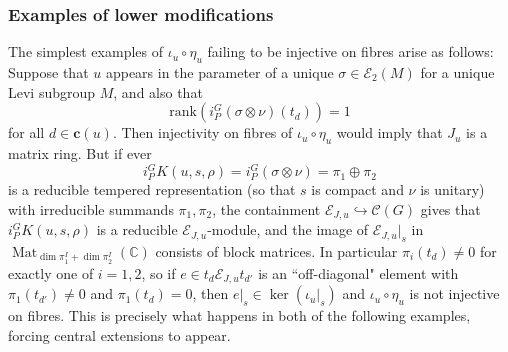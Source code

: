 \documentclass[10pt]{article}
\def\into{\mathrel{\hookrightarrow}}
\DeclareMathOperator{\Mat}{Mat}
\newcommand{\C}{\mathbb{C}}
\newcommand{\cc}{\mathbf{c}}
\theoremstyle{definition}
\theoremstyle{remark}
\newcommand{\rank}{\mathrm{rank}}
\begin{document}
\subsubsection{Examples of lower modifications}
The simplest examples of $\iota_u\circ\eta_u$ failing to be injective on fibres arise as follows: Suppose that $u$ appears in the parameter of a unique $\sigma\in\mathcal{E}_2(M)$ for a unique Levi subgroup $M$, and also that 
%
\[
\rank\left(i_P^G(\sigma\otimes\nu)(t_d)\right)=1
\]
% 
for all $d\in\cc(u)$. Then injectivity on fibres of $\iota_u\circ\eta_u$ would imply
that $J_u$ is a matrix ring. But if ever 
%
\[
i_P^GK(u,s,\rho)=i_P^G(\sigma\otimes\nu)=\pi_1\oplus\pi_2
\]
%
is a reducible tempered representation (so that $s$ is compact and $\nu$ is unitary) with irreducible
summands $\pi_1,\pi_2$,
the containment $\mathcal{E}_{J,u}\into\mathcal{C}(G)$ gives that $i_P^GK(u,s,\rho)$ is a 
reducible $\mathcal{E}_{J,u}$-module, and the image of $\mathcal{E}_{J,u}|_s$ in 
$\Mat_{\dim\pi_1^I+\dim\pi_2^I}(\C)$ consists of block matrices. In particular $\pi_i(t_d)\neq 0$ for exactly
one of $i=1,2$, so if $e\in t_d\mathcal{E}_{J,u}t_{d'}$ is an ``off-diagonal" element with 
$\pi_1(t_{d'})\neq 0$ and $\pi_1(t_d)=0$, then $e|_s\in\ker(\iota_u|_s)$ and $\iota_u\circ\eta_u$ is not 
injective on fibres. This is precisely what happens in both of the following examples, forcing central 
extensions to appear. 
%
\end{document}
